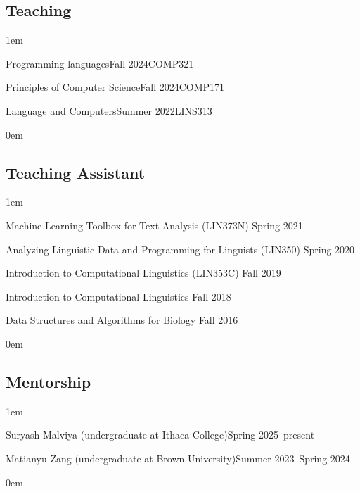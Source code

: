 \subsection{Teaching}
\leftskip1em\relax

  {Programming languages}{Fall 2024}{COMP321}{}
  
  {Principles of Computer Science}{Fall 2024}{COMP171}{}

  {Language and Computers}{Summer 2022}{LINS313}{}

\leftskip0em\relax
  
\subsection{Teaching Assistant}
\leftskip1em\relax
\vspace{0.6\baselineskip}

\textbullet\enspace Machine Learning Toolbox for Text Analysis ({\rmsc LIN373N}) \hfill Spring 2021

\textbullet\enspace Analyzing Linguistic Data and Programming for Linguists ({\rmsc LIN350}) \hfill Spring 2020

\textbullet\enspace Introduction to Computational Linguistics ({\rmsc LIN353C}) \hfill Fall 2019

\textbullet\enspace Introduction to Computational Linguistics \hfill Fall 2018

\textbullet\enspace Data Structures and Algorithms for Biology \hfill Fall 2016

\leftskip0em\relax

\subsection{Mentorship}
\leftskip1em\relax

  {\normalsize Suryash Malviya (undergraduate at Ithaca College)}{\normalsize Spring 2025--present}{}{}
  
  {\normalsize Matianyu Zang (undergraduate at Brown University)}{\normalsize Summer 2023--Spring 2024}{}{}

\leftskip0em\relax
